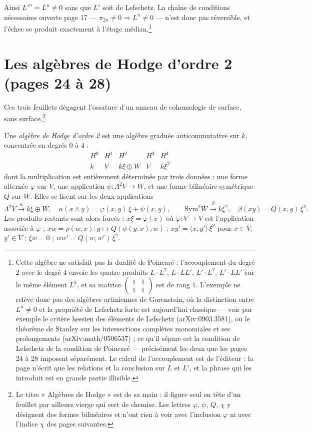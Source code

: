 \documentclass[11pt,a4paper]{article}
\begin{document}
Ainsi $L'^{n} = L^{n} \neq 0$ sans que $L'$ soit de Lefschetz. La chaîne de
conditions nécessaires ouverte page 17 --- $\pi_{2n} \neq 0 \Rightarrow L^{n}
\neq 0$ --- n'est donc pas réversible, et l'échec se produit exactement à
l'étage médian.\footnote{Cette algèbre ne satisfait pas la dualité de Poincaré :
l'accouplement du degré $2$ avec le degré $4$ envoie les quatre produits
$L \cdot L^{2}$, $L \cdot LL'$, $L' \cdot L^{2}$, $L' \cdot LL'$ sur le même
élément $L^{3}$, et sa matrice $\left(\begin{smallmatrix} 1 & 1 \\ 1 & 1
\end{smallmatrix}\right)$ est de rang $1$. L'exemple ne relève donc pas des
algèbres artiniennes de Gorenstein, où la distinction entre $L^{n} \neq 0$ et
la propriété de Lefschetz forte est aujourd'hui classique --- voir par exemple
le critère hessien des éléments de Lefschetz (arXiv:0903.3581), ou le
théorème de Stanley sur les intersections complètes monomiales et ses
prolongements (arXiv:math/0506537) ; ce qu'il sépare est
la condition de Lefschetz de la condition de Poincaré --- précisément les deux
que les pages 24 à 28 imposent séparément. Le calcul de l'accouplement est de
l'éditeur : la page n'écrit que les relations et la conclusion sur $L$ et $L'$,
et la phrase qui les introduit est en grande partie illisible.}

\section*{Les algèbres de Hodge d'ordre 2 (pages 24 à 28)}

Ces trois feuillets dégagent l'ossature d'un anneau de cohomologie de surface,
sans surface.\footnote{Le titre « Algèbres de Hodge » est de sa main : il
figure seul en tête d'un feuillet par ailleurs vierge qui sert de chemise. Les
lettres $\varphi$, $\psi$, $Q$, $\chi$ y désignent des formes bilinéaires et
n'ont rien à voir avec l'inclusion $\varphi$ ni avec l'indice $\chi$ des pages
suivantes.}

Une \emph{algèbre de Hodge d'ordre 2} est une algèbre graduée
anticommutative sur $k$, concentrée en degrés $0$ à $4$ :
\[
\begin{array}{ccccc}
H^{0} & H^{1} & H^{2} & H^{3} & H^{4} \\
k & V & k\xi \oplus W & \check{V} & k\xi^{2}
\end{array}
\]
dont la multiplication est entièrement déterminée par trois données : une
forme alternée $\varphi$ sur $V$, une application $\psi \colon \Lambda^{2}V \to
W$, et une forme bilinéaire symétrique $Q$ sur $W$. Elles se lisent sur les
deux applications
\[
\Lambda^{2}V \xrightarrow{\ \alpha\ } k\xi \oplus W,
\quad \alpha(x \wedge y) = \varphi(x,y)\,\xi + \psi(x,y),
\qquad
\mathrm{Sym}^{2}W \xrightarrow{\ \beta\ } k\xi^{2},
\quad \beta(xy) = Q(x,y)\,\xi^{2} .
\]
Les produits restants sont alors forcés : $x\xi = \tilde\varphi(x)$ où
$\tilde\varphi \colon V \to \check{V}$ est l'application associée à $\varphi$ ;
$xw = \rho(w,x) \colon y \mapsto Q(\psi(y,x), w)$ ; $x y' = \langle x, y'
\rangle\,\xi^{2}$ pour $x \in V$, $y' \in \check{V}$ ; $\xi w = 0$ ;
$ww' = Q(w,w')\,\xi^{2}$.
\end{document}

